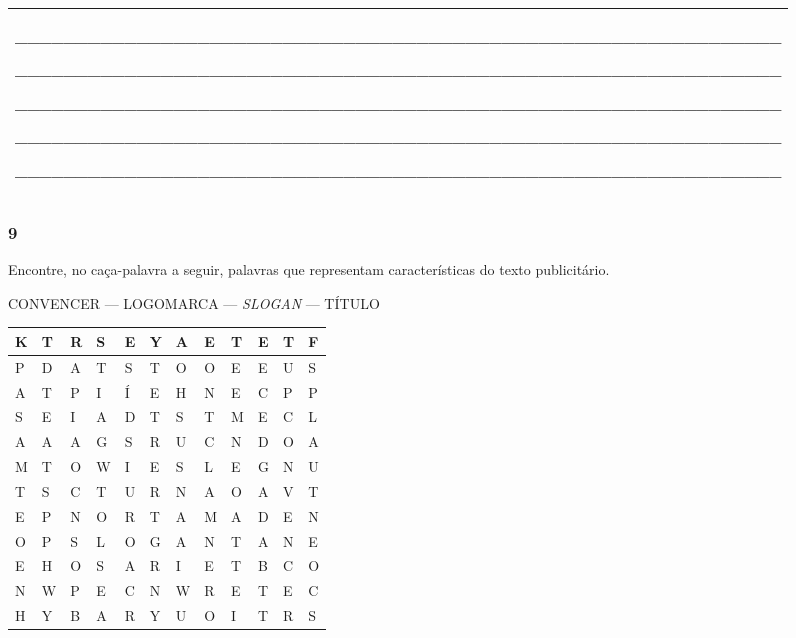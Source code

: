 
\begin{longtable}[]{@{}l@{}}
\toprule
\begin{minipage}[t]{0.97\columnwidth}\raggedright\strut
\_\_\_\_\_\_\_\_\_\_\_\_\_\_\_\_\_\_\_\_\_\_\_\_\_\_\_\_\_\_\_\_\_\_\_\_\_\_\_\_\_\_\_\_\_\_\_\_\_\_\_\_\_\_\_\_\_\_\_\_\_\_\_

\_\_\_\_\_\_\_\_\_\_\_\_\_\_\_\_\_\_\_\_\_\_\_\_\_\_\_\_\_\_\_\_\_\_\_\_\_\_\_\_\_\_\_\_\_\_\_\_\_\_\_\_\_\_\_\_\_\_\_\_\_\_\_

\_\_\_\_\_\_\_\_\_\_\_\_\_\_\_\_\_\_\_\_\_\_\_\_\_\_\_\_\_\_\_\_\_\_\_\_\_\_\_\_\_\_\_\_\_\_\_\_\_\_\_\_\_\_\_\_\_\_\_\_\_\_\_

\_\_\_\_\_\_\_\_\_\_\_\_\_\_\_\_\_\_\_\_\_\_\_\_\_\_\_\_\_\_\_\_\_\_\_\_\_\_\_\_\_\_\_\_\_\_\_\_\_\_\_\_\_\_\_\_\_\_\_\_\_\_\_

\_\_\_\_\_\_\_\_\_\_\_\_\_\_\_\_\_\_\_\_\_\_\_\_\_\_\_\_\_\_\_\_\_\_\_\_\_\_\_\_\_\_\_\_\_\_\_\_\_\_\_\_\_\_\_\_\_\_\_\_\_\_\_\strut
\end{minipage}\tabularnewline
\bottomrule
\end{longtable}

\subsubsection{9}\label{section-42}

Encontre, no caça-palavra a seguir, palavras que representam
características do texto publicitário.

CONVENCER --- LOGOMARCA --- \textit{SLOGAN} --- TÍTULO

\begin{longtable}[]{@{}llllllllllll@{}}
\toprule
K & T & R & S & E & Y & A & E & T & E & T & F\tabularnewline
\midrule
\endhead
P & D & A & T & S & T & O & O & E & E & U & S\tabularnewline
A & T & P & I & Í & E & H & N & E & C & P & P\tabularnewline
S & E & I & A & D & T & S & T & M & E & C & L\tabularnewline
A & A & A & G & S & R & U & C & N & D & O & A\tabularnewline
M & T & O & W & I & E & S & L & E & G & N & U\tabularnewline
T & S & C & T & U & R & N & A & O & A & V & T\tabularnewline
E & P & N & O & R & T & A & M & A & D & E & N\tabularnewline
O & P & S & L & O & G & A & N & T & A & N & E\tabularnewline
E & H & O & S & A & R & I & E & T & B & C & O\tabularnewline
N & W & P & E & C & N & W & R & E & T & E & C\tabularnewline
H & Y & B & A & R & Y & U & O & I & T & R & S\tabularnewline
\bottomrule
\end{longtable}

